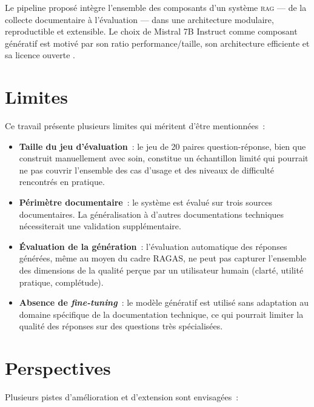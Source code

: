 \documentclass[12pt,a4paper,oneside]{report}
\newcommand{\rag}{\textsc{rag}}
\begin{document}
Le pipeline proposé intègre l'ensemble des composants d'un système \rag{} --- de la collecte documentaire à l'évaluation --- dans une architecture modulaire, reproductible et extensible. Le choix de Mistral 7B Instruct comme composant génératif est motivé par son ratio performance/taille, son architecture efficiente et sa licence ouverte \citep{jiang2023mistral}.

\section{Limites}

Ce travail présente plusieurs limites qui méritent d'être mentionnées~:

\begin{itemize}
  \item \textbf{Taille du jeu d'évaluation}~: le jeu de 20 paires question-réponse, bien que construit manuellement avec soin, constitue un échantillon limité qui pourrait ne pas couvrir l'ensemble des cas d'usage et des niveaux de difficulté rencontrés en pratique.
  \item \textbf{Périmètre documentaire}~: le système est évalué sur trois sources documentaires. La généralisation à d'autres documentations techniques nécessiterait une validation supplémentaire.
  \item \textbf{Évaluation de la génération}~: l'évaluation automatique des réponses générées, même au moyen du cadre RAGAS, ne peut pas capturer l'ensemble des dimensions de la qualité perçue par un utilisateur humain (clarté, utilité pratique, complétude).
  \item \textbf{Absence de \textit{fine-tuning}}~: le modèle génératif est utilisé sans adaptation au domaine spécifique de la documentation technique, ce qui pourrait limiter la qualité des réponses sur des questions très spécialisées.
\end{itemize}

\section{Perspectives}

Plusieurs pistes d'amélioration et d'extension sont envisagées~:
\end{document}
